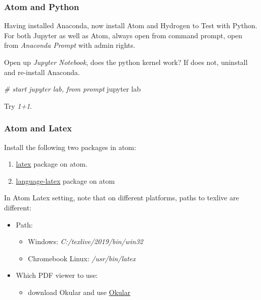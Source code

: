\documentclass[]{article}
\newenvironment{Shaded}{\begin{snugshade}}{\end{snugshade}}
\newcommand{\CommentTok}[1]{\textcolor[rgb]{0.56,0.35,0.01}{\textit{#1}}}
\newcommand{\ExtensionTok}[1]{#1}
\newcommand{\NormalTok}[1]{#1}
\providecommand{\tightlist}{%
  \setlength{\itemsep}{0pt}\setlength{\parskip}{0pt}}
\begin{document}
\hypertarget{atom-and-python}{%
\subsubsection{Atom and Python}\label{atom-and-python}}

Having installed Anaconda, now install Atom and Hydrogen to Test with
Python. For both Jupyter as well as Atom, always open from command
prompt, open from \emph{Anaconda Prompt} with admin rights.

Open up \emph{Jupyter Notebook}, does the python kernel work? If does
not, uninstall and re-install Anaconda.

\begin{Shaded}
\begin{Highlighting}[]
\CommentTok{# start jupyter lab, from prompt}
\ExtensionTok{jupyter}\NormalTok{ lab}
\end{Highlighting}
\end{Shaded}

Try \emph{1+1}.

\hypertarget{atom-and-latex}{%
\subsubsection{Atom and Latex}\label{atom-and-latex}}

Install the following two packages in atom:

\begin{enumerate}
\def\labelenumi{\arabic{enumi}.}
\tightlist
\item
  \href{https://github.com/thomasjo/atom-latex}{latex} package on atom.
\item
  \href{https://atom.io/packages/language-latex}{language-latex} package
  on atom
\end{enumerate}

In Atom Latex setting, note that on different platforms, paths to
texlive are different:

\begin{itemize}
\tightlist
\item
  Path:

  \begin{itemize}
  \tightlist
  \item
    Windows: \emph{C:/texlive/2019/bin/win32}
  \item
    Chromebook Linux: \emph{/usr/bin/latex}
  \end{itemize}
\item
  Which PDF viewer to use:

  \begin{itemize}
  \tightlist
  \item
    download Okular and use \href{https://okular.kde.org/}{Okular}
  \end{itemize}
\end{itemize}
\end{document}
